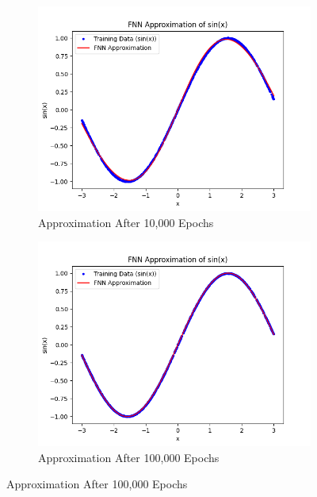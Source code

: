 \documentclass{article}
\begin{document}
\begin{figure}[h!]
    \begin{subfigure}{0.45\textwidth}
        \centering
        \includegraphics[width=\linewidth]{figs/FNN_Test03.png}
        \caption{Approximation After 10,000 Epochs}
        \label{fig:10000epochs}
    \end{subfigure}
    \hfill
    \begin{subfigure}{0.45\textwidth}
        \centering
        \includegraphics[width=\linewidth]{figs/FNN_Test04.png}
        \caption*{Approximation After 100,000 Epochs}
        \label{fig:finalapproximation}
    \end{subfigure}
    \label{fig:sin_approximation}
\end{figure}
\end{document}
